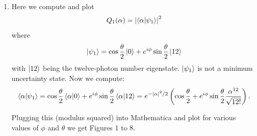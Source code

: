 \documentclass{article}
\theoremstyle{definition}
\newcommand{\al}{\alpha}
\newcommand{\f}[2]{\frac{#1}{#2}}
\newcommand{\lp}{\left(}
\newcommand{\rp}{\right)}
\begin{document}
\begin{enumerate}[label=\alph*)]
	\item Here we compute and plot 
	\begin{align*}
		Q_1(\al) = \abs{\braket{\al}{\psi_1}}^2
	\end{align*}
	where
	\begin{align*}
		\ket{\psi_1} = \cos \f{\theta}{2} \ket{0} + e^{i\phi} \sin\f{\theta}{2}\ket{12}
	\end{align*}
	with $\ket{12}$ being the twelve-photon number eigenstate. $\ket{\psi_1}$ is not a minimum uncertainty state. Now we compute:
	\begin{align*}
		\braket{\al}{\psi_1} = \cos\f{\theta}{2} \braket{\al}{0} + e^{i\phi}\sin\f{\theta}{2} \braket{\al}{12} = e^{-\abs{\al}^2/2}\lp \cos\f{\theta}{2}  + e^{i\phi} \sin\f{\theta}{2} \f{\al^{12}}{\sqrt{12!}} \rp.
	\end{align*}
	
	Plugging this (modulus squared) into Mathematica and plot for various values of $\phi$ and $\theta$ we get Figures 1 to 8.
	

\end{enumerate}
\end{document}
